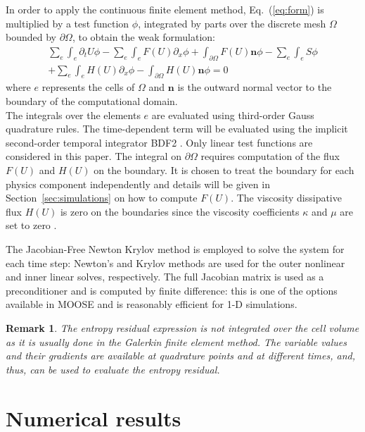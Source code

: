 \documentclass[review]{elsarticle}
\newtheorem{remark}{Remark}[section]
\newcommand{\eqt}[1]{Eq.~(\ref{#1})}                     %
\newcommand{\sect}[1]{Section~\ref{#1}}                     %
\begin{document}
In order to apply the continuous finite element method, \eqt{eq:form} is multiplied by a test function $\phi$, integrated by parts over the discrete mesh $\Omega$ bounded by $\partial \Omega$, to obtain the weak formulation:
\begin{multline}
\sum_e \int_{e} \partial_t U \phi - \sum_e \int_{e} F(U) \partial_x \phi + \int_{\partial \Omega} F(U) \mathbf{n} \phi - 
 \sum_e \int_{e} S \phi \\
 + \sum_e \int_{e} H(U) \partial_x \phi - \int_{\partial \Omega}H \left( U \right) \mathbf{n} \phi= 0
\end{multline}
where $e$ represents the cells of $\Omega$ and $\mathbf{n}$ is the outward normal vector to the boundary of the computational domain. \\
The integrals over the elements $e$ are evaluated using third-order Gauss quadrature rules. The time-dependent term will be evaluated using the implicit second-order temporal integrator BDF2 \cite{Leveque}. Only linear test functions are considered in this paper.
The integral on $\partial \Omega$ requires computation of the flux $F(U)$ and $H(U)$ on the boundary. It is chosen to treat the boundary for each physics component independently and details will be given in \sect{sec:simulations} on how to compute $F(U)$. The viscosity dissipative flux $H(U)$ is zero on the boundaries since the viscosity coefficients $\kappa$ and $\mu$ are set to zero \cite{jlg1, jlg2, valentin}. 

The Jacobian-Free Newton Krylov method \cite{JFNK} is employed to solve the system for each time step: Newton's and Krylov methods are used for the outer nonlinear and inner linear solves, respectively. The full Jacobian matrix is used as a preconditioner and is computed by finite difference: this is one of the options available in MOOSE and is reasonably efficient for 1-D simulations. 

\begin{remark}
The entropy residual expression is not integrated over the cell volume as it is usually done in the Galerkin finite element method. The variable values and their gradients are available at quadrature points and at different times, and, thus, can be used to evaluate the entropy residual. 
\end{remark}

\section{Numerical results}
\label{sec:num-res}
\end{document}
